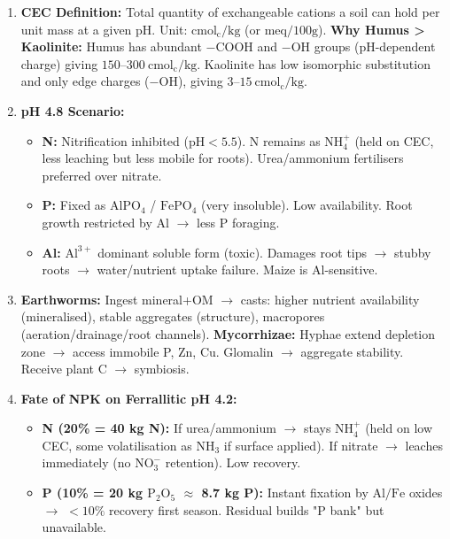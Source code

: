 \documentclass[11pt]{article}
\begin{document}
\begin{corrige}
\begin{enumerate}
    \item \textbf{CEC Definition:} Total quantity of exchangeable cations a soil can hold per unit mass at a given pH. Unit: $\mathrm{cmol_c/kg}$ (or $\mathrm{meq/100g}$). \textbf{Why Humus > Kaolinite:} Humus has abundant $\mathrm{-COOH}$ and $\mathrm{-OH}$ groups (pH-dependent charge) giving $150\text{--}300\ \mathrm{cmol_c/kg}$. Kaolinite has low isomorphic substitution and only edge charges ($\mathrm{-OH}$), giving $3\text{--}15\ \mathrm{cmol_c/kg}$.
    \item \textbf{pH 4.8 Scenario:}
        \begin{itemize}
            \item \textbf{N:} Nitrification inhibited ($\mathrm{pH} < 5.5$). N remains as $\mathrm{NH_4^+}$ (held on CEC, less leaching but less mobile for roots). Urea/ammonium fertilisers preferred over nitrate.
            \item \textbf{P:} Fixed as $\mathrm{AlPO_4}$ / $\mathrm{FePO_4}$ (very insoluble). Low availability. Root growth restricted by $\mathrm{Al}$ $\to$ less P foraging.
            \item \textbf{Al:} $\mathrm{Al^{3+}}$ dominant soluble form (toxic). Damages root tips $\to$ stubby roots $\to$ water/nutrient uptake failure. Maize is Al-sensitive.
        \end{itemize}
    \item \textbf{Earthworms:} Ingest mineral+OM $\to$ casts: higher nutrient availability (mineralised), stable aggregates (structure), macropores (aeration/drainage/root channels). \textbf{Mycorrhizae:} Hyphae extend depletion zone $\to$ access immobile P, Zn, Cu. Glomalin $\to$ aggregate stability. Receive plant C $\to$ symbiosis.
    \item \textbf{Fate of NPK on Ferrallitic pH 4.2:}
        \begin{itemize}
            \item \textbf{N (20\% = 40 kg N):} If urea/ammonium $\to$ stays $\mathrm{NH_4^+}$ (held on low CEC, some volatilisation as $\mathrm{NH_3}$ if surface applied). If nitrate $\to$ leaches immediately (no $\mathrm{NO_3^-}$ retention). Low recovery.
            \item \textbf{P (10\% = 20 kg $\mathrm{P_2O_5}$ $\approx$ 8.7 kg P):} Instant fixation by $\mathrm{Al/Fe}$ oxides $\to$ $< 10\%$ recovery first season. Residual builds "P bank" but unavailable.

\end{itemize}
\end{enumerate}
\end{corrige}
\end{document}
